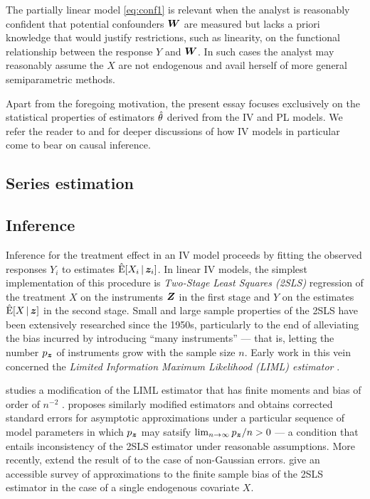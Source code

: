 \documentclass{uwstat572}
\theoremstyle{definition}
\theoremstyle{remark}
\newcommand{\E}{\mathrm{E}}
\newcommand{\Ehat}{\hat{\E}}
\numberwithin{equation}{section}
\begin{document}
The partially linear model \ref{eq:conf1} is relevant when the analyst is reasonably confident that potential confounders $\boldsymbol{W}$ are measured but lacks a priori knowledge that would justify restrictions, such as linearity, on the functional relationship between the response $Y$ and $\boldsymbol{W}$. In such cases the analyst may reasonably assume the $X$ are not endogenous and avail herself of more general semiparametric methods.

Apart from the foregoing motivation, the present essay focuses exclusively on the statistical properties of estimators $\hat{\theta}$ derived from the IV and PL models. We refer the reader to \cite[Chapter 5]{P09} and \cite{AK01} for deeper discussions of how IV models in particular come to bear on causal inference. 


%
% 
\subsection{Series estimation}\label{ss:se}



%

\subsection{Inference}

Inference for the treatment effect in an IV model proceeds by fitting the observed responses $Y_i$ to estimates $\Ehat[X_i\,|\,\z_i]$. In linear IV models, the simplest implementation of this procedure is \emph{Two-Stage Least Squares (2SLS)} regression of the treatment $X$ on the instruments $\boldsymbol{Z}$ in the first stage and $Y$ on the estimates $\Ehat[X\,|\,\z]$ in the second stage. Small and large sample properties of the 2SLS have been extensively researched since the 1950s, particularly to the end of alleviating the bias incurred by introducing ``many instruments'' --- that is, letting the number ${p_{\boldsymbol{z}}}$ of instruments grow with the sample size $n$. Early work in this vein concerned the \emph{Limited Information Maximum Likelihood (LIML) estimator} . 

\cite{F77} studies a modification of the LIML estimator that has finite moments and bias of order of $n^{-2}$ . \cite{B94} proposes similarly modified estimators and obtains corrected standard errors for asymptotic approximations under a particular sequence of model parameters in which ${p_{\boldsymbol{z}}}$ may satsify $\lim_{n\to\infty} {p_{\boldsymbol{z}}}/n > 0$ --- a condition that entails inconsistency of the 2SLS estimator under reasonable assumptions. More recently, \cite{HHN08} extend the result of \cite{B94} to the case of non-Gaussian errors. \cite{BW11} give an accessible survey of approximations to the finite sample bias of the 2SLS estimator in the case of a single endogenous covariate $X$. 
\end{document}
